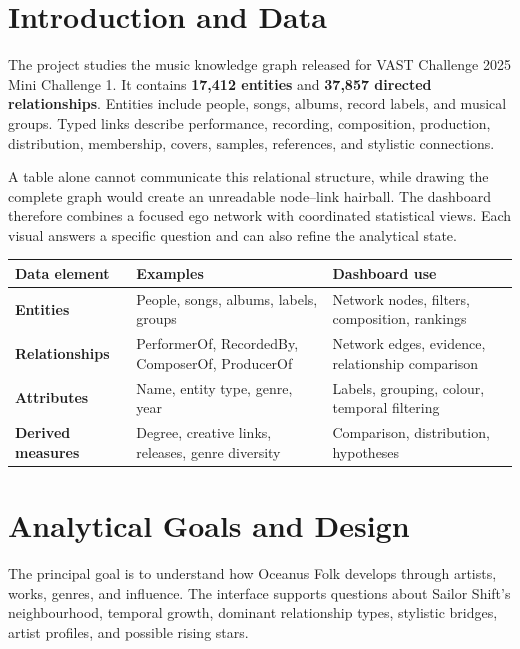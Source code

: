 \documentclass[9pt,a4paper]{article}
\begin{document}
\section{Introduction and Data}
The project studies the music knowledge graph released for VAST Challenge 2025 Mini Challenge 1. It contains \textbf{17,412 entities} and \textbf{37,857 directed relationships}. Entities include people, songs, albums, record labels, and musical groups. Typed links describe performance, recording, composition, production, distribution, membership, covers, samples, references, and stylistic connections.

A table alone cannot communicate this relational structure, while drawing the complete graph would create an unreadable node--link hairball. The dashboard therefore combines a focused ego network with coordinated statistical views. Each visual answers a specific question and can also refine the analytical state.

\begin{table}[H]\centering\small
\begin{tabularx}{\textwidth}{>{\bfseries}p{2.7cm} >{\raggedright\arraybackslash}X >{\raggedright\arraybackslash}X}
\toprule
Data element & Examples & Dashboard use \\
\midrule
Entities & People, songs, albums, labels, groups & Network nodes, filters, composition, rankings \\
Relationships & PerformerOf, RecordedBy, ComposerOf, ProducerOf & Network edges, evidence, relationship comparison \\
Attributes & Name, entity type, genre, year & Labels, grouping, colour, temporal filtering \\
Derived measures & Degree, creative links, releases, genre diversity & Comparison, distribution, hypotheses \\
\bottomrule
\end{tabularx}
\end{table}

\section{Analytical Goals and Design}
The principal goal is to understand how Oceanus Folk develops through artists, works, genres, and influence. The interface supports questions about Sailor Shift's neighbourhood, temporal growth, dominant relationship types, stylistic bridges, artist profiles, and possible rising stars.
\end{document}
